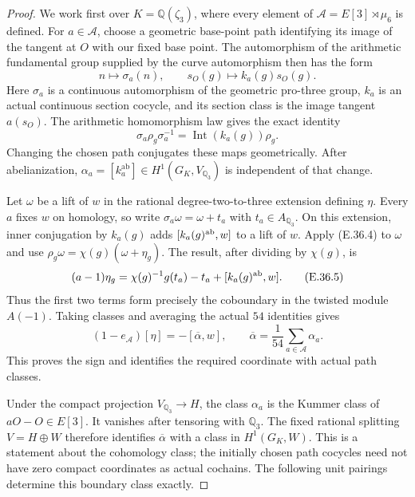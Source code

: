 \begin{proof}
We work first over $K=\mathbb Q(\zeta_3)$,
where every element of
$\mathcal A=E[3]\rtimes\mu_6$ is defined.
For $a\in\mathcal A$, choose a geometric
base-point path identifying its image of
the tangent at $O$ with our fixed base point.
The automorphism of the arithmetic fundamental
group supplied by the curve automorphism
then has the form
\[
 n\longmapsto\sigma_a(n),\qquad
 s_O(g)\longmapsto k_a(g)s_O(g).
 \tag{E.36.3}
\]
Here $\sigma_a$ is a continuous automorphism
of the geometric pro-three group, $k_a$ is
an actual continuous section cocycle, and
its section class is the image tangent
$a(s_O)$. The arithmetic homomorphism law
gives the exact identity
\[
 \sigma_a\rho_g\sigma_a^{-1}
        =\operatorname{Int}(k_a(g))\rho_g.
 \tag{E.36.4}
\]
Changing the chosen path conjugates these
maps geometrically. After abelianization,
$\alpha_a=[k_a^{\mathrm{ab}}]\in H^1(G_K,V_{\mathbb Q_3})$
is independent of that change.

Let $\omega$ be a lift of $w$ in the rational
degree-two-to-three extension defining $\eta$.
Every $a$ fixes $w$ on homology, so write
$\sigma_a\omega=\omega+t_a$ with $t_a\in A_{\mathbb Q_3}$.
On this extension, inner conjugation by
$k_a(g)$ adds $[k_a(g)^{\rm ab},w]$ to a lift
of $w$. Apply (E.36.4) to $\omega$ and use
$\rho_g\omega=\chi(g)(\omega+\eta_g)$.
The result, after dividing by $\chi(g)$, is
\[
 (a-1)\eta_g
    =\chi(g)^{-1}g(t_a)-t_a
                    +[k_a(g)^{\rm ab},w].
 \tag{E.36.5}
\]
Thus the first two terms form precisely the
coboundary in the twisted module $A(-1)$.
Taking classes and averaging the actual
$54$ identities gives
\[
 (1-e_{\mathcal A})[\eta]
       =-[\overline\alpha,w],
 \qquad
 \overline\alpha=\frac1{54}\sum_{a\in\mathcal A}\alpha_a.
 \tag{E.36.6}
\]
This proves the sign and identifies the
required coordinate with actual path classes.

Under the compact projection
$V_{\mathbb Q_3}\to H$, the class $\alpha_a$
is the Kummer class of $aO-O\in E[3]$.
It vanishes after tensoring with $\mathbb Q_3$.
The fixed rational splitting $V=H\oplus W$
therefore identifies $\overline\alpha$ with
a class in $H^1(G_K,W)$. This is a statement
about the cohomology class; the initially
chosen path cocycles need not have zero
compact coordinates as actual cochains.
The following unit pairings determine this
boundary class exactly.


\end{proof}
